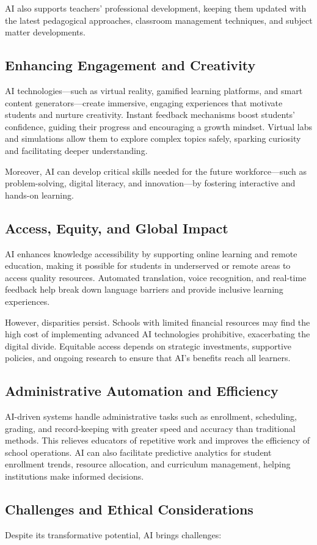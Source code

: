\documentclass[12pt, letterpaper]{article}
\begin{document}
AI also supports teachers’ professional development, keeping them updated with the latest pedagogical approaches, classroom management techniques, and subject matter developments.
\subsection{Enhancing Engagement and Creativity}
AI technologies—such as virtual reality, gamified learning platforms, and smart content generators—create immersive, engaging experiences that motivate students and nurture creativity. Instant feedback mechanisms boost students’ confidence, guiding their progress and encouraging a growth mindset. Virtual labs and simulations allow them to explore complex topics safely, sparking curiosity and facilitating deeper understanding.

Moreover, AI can develop critical skills needed for the future workforce—such as problem-solving, digital literacy, and innovation—by fostering interactive and hands-on learning.
\subsection{Access, Equity, and Global Impact}
AI enhances knowledge accessibility by supporting online learning and remote education, making it possible for students in underserved or remote areas to access quality resources. Automated translation, voice recognition, and real-time feedback help break down language barriers and provide inclusive learning experiences.

However, disparities persist. Schools with limited financial resources may find the high cost of implementing advanced AI technologies prohibitive, exacerbating the digital divide. Equitable access depends on strategic investments, supportive policies, and ongoing research to ensure that AI’s benefits reach all learners.
\subsection{Administrative Automation and Efficiency}
AI-driven systems handle administrative tasks such as enrollment, scheduling, grading, and record-keeping with greater speed and accuracy than traditional methods. This relieves educators of repetitive work and improves the efficiency of school operations. AI can also facilitate predictive analytics for student enrollment trends, resource allocation, and curriculum management, helping institutions make informed decisions.
\subsection{Challenges and Ethical Considerations}
Despite its transformative potential, AI brings challenges:
\end{document}
